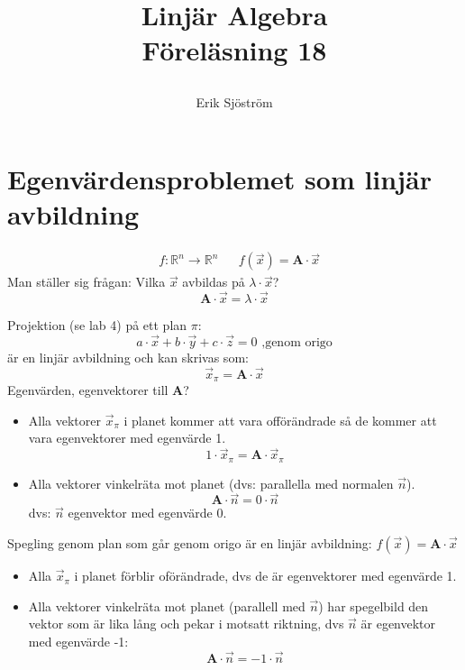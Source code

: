 

\title{
	 Linjär Algebra\\
	 Föreläsning 18
    \author{Erik Sjöström}
}

\maketitle

\section{Egenvärdensproblemet som linjär avbildning} %
\label{sec:egenv_rdensproblemet_som_linj_r_avbildning}
\begin{align*}
&f : \mathbb{R}^n \rightarrow \mathbb{R}^n
&&f(\vec{x}) = \mathbf{A} \cdot \vec{x}
\end{align*}
\noindent
Man ställer sig frågan: Vilka $\vec{x}$ avbildas på $\lambda \cdot \vec{x}$?
\[
	\mathbf{A} \cdot \vec{x} = \lambda \cdot \vec{x}
\]
\begin{Ex}
	Projektion (se lab 4) på ett plan $\pi$:
	\[
	a \cdot \vec{x} + b \cdot \vec{y} + c \cdot \vec{z} = 0 \mbox{ ,genom origo}
	\]
	är en linjär avbildning och kan skrivas som:
	\[
	\vec{x}_{\pi} = \mathbf{A} \cdot \vec{x}
	\]
	Egenvärden, egenvektorer till \textbf{A}?
	\begin{itemize}
		\item Alla vektorer $\vec{x}_{\pi}$ i planet kommer att vara offörändrade så de kommer att vara egenvektorer med egenvärde 1.
		\[
		1 \cdot \vec{x}_{\pi} = \mathbf{A} \cdot \vec{x}_{\pi}
		\]
		\item Alla vektorer vinkelräta mot planet (dvs: parallella med normalen $\vec{n}$).
		\[
		\mathbf{A} \cdot \vec{n} = 0 \cdot \vec{n} 
		\]
		dvs: $\vec{n}$ egenvektor med egenvärde 0.  
	\end{itemize}
\end{Ex}
\begin{Ex}
	Spegling genom plan som går genom origo är en linjär avbildning: $f(\vec{x}) = \mathbf{A} \cdot \vec{x}$
	\begin{itemize}
		\item Alla $\vec{x}_{\pi}$ i planet förblir oförändrade, dvs de är egenvektorer med egenvärde 1.
		\item Alla vektorer vinkelräta mot planet (parallell med $\vec{n}$)  har spegelbild den vektor som är lika lång och pekar i motsatt riktning, dvs $\vec{n}$ är egenvektor med egenvärde -1:
		\[
		\mathbf{A} \cdot \vec{n} = -1 \cdot \vec{n}
		\]
	\end{itemize}
\end{Ex}

